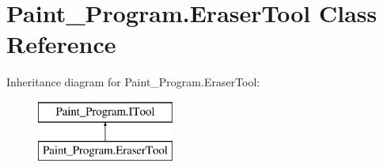 \hypertarget{class_paint___program_1_1_eraser_tool}{}\section{Paint\+\_\+\+Program.\+Eraser\+Tool Class Reference}
\label{class_paint___program_1_1_eraser_tool}
Inheritance diagram for Paint\+\_\+\+Program.\+Eraser\+Tool\+:\begin{figure}[H]
\begin{center}
\leavevmode
\includegraphics[height=2.000000cm]{class_paint___program_1_1_eraser_tool}
\end{center}
\end{figure}
